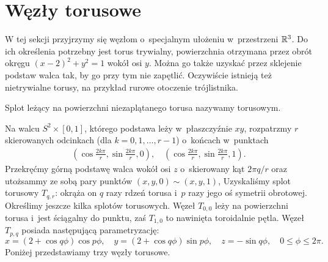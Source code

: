 \section{Węzły torusowe} %

W tej sekcji przyjrzymy się węzłom o~specjalnym ułożeniu w~przestrzeni $\mathbb R^3$.
Do ich określenia potrzebny jest torus trywialny, powierzchnia otrzymana przez obrót okręgu $(x-2)^2 + y^2 = 1$ wokół osi $y$.
Można go także uzyskać przez sklejenie podstaw walca tak, by go przy tym nie zapętlić.
Oczywiście istnieją też nietrywialne torusy, na przykład rurowe otoczenie trójlistnika.

\begin{definition}
    Splot leżący na powierzchni niezaplątanego torusa nazywamy torusowym.
\end{definition}

Na walcu $S^2 \times [0,1]$, którego podstawa leży w~płaszczyźnie $xy$, rozpatrzmy $r$ skierowanych odcinkach (dla $k = 0, 1, \ldots, r - 1$) o~końcach w~punktach
\begin{align*}
    \left(\cos \frac{2k \pi}{r}, \sin \frac{2k\pi}{r}, 0 \right), \quad
    \left(\cos \frac{2k \pi}{r}, \sin \frac{2k\pi}{r}, 1 \right).
\end{align*}
Przekręćmy górną podstawę walca wokół osi $z$ o~skierowany kąt $2\pi q / r$ oraz utożsammy ze sobą pary punktów $(x, y, 0) \sim (x, y, 1)$,
Uzyskaliśmy splot torusowy $T_{q, r}$: okrąża on $q$ razy rdzeń torusa i~$p$ razy jego oś symetrii obrotowej.
Określimy jeszcze kilka splotów torusowych.
Węzeł $T_{0, 0}$ leży na powierzchni torusa i~jest ściągalny do punktu, zaś $T_{1, 0}$ to nawinięta toroidalnie pętla.
Węzeł $T_{p, q}$ posiada następującą parametryzację:
\[
    x = (2+\cos q \phi) \cos p \phi, \quad
    y = (2+\cos q \phi) \sin p \phi, \quad
    z = - \sin q \phi, \quad
    0 \le \phi \le 2\pi.
\]
Poniżej przedstawiamy trzy węzły torusowe.

